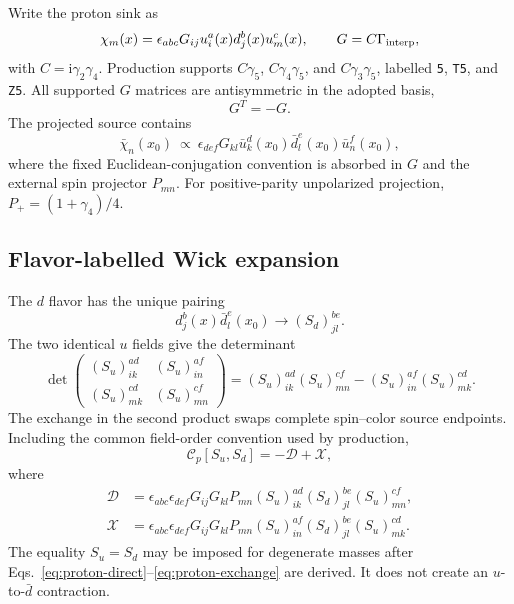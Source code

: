 \documentclass[11pt,a4paper]{article}
\numberwithin{equation}{section}
\newcommand{\ii}{\mathrm{i}}
\newcommand{\code}[1]{%
  \ifmmode\text{\texttt{\detokenize{#1}}}\else\nolinkurl{#1}\fi}
\begin{document}
Write the proton sink as
\begin{equation}
 \chi_m(x)
 =\epsilon_{abc}G_{ij}
 u_i^a(x)d_j^b(x)u_m^c(x),
 \qquad G=C\Gamma_{\rm interp},
 \label{eq:proton-interpolator}
\end{equation}
with \(C=\ii\gamma_2\gamma_4\).  Production supports
\(C\gamma_5\), \(C\gamma_4\gamma_5\), and
\(C\gamma_3\gamma_5\), labelled \code{5}, \code{T5}, and \code{Z5}.
All supported \(G\) matrices are antisymmetric in the adopted basis,
\begin{equation}
 G^T=-G.
\end{equation}
The projected source contains
\begin{equation}
 \bar\chi_n(x_0)\ \propto\
 \epsilon_{def}G_{kl}
 \bar u_k^d(x_0)\bar d_l^e(x_0)\bar u_n^f(x_0),
\end{equation}
where the fixed Euclidean-conjugation convention is absorbed in \(G\) and the
external spin projector \(P_{mn}\).  For positive-parity unpolarized
projection, \(P_+=(1+\gamma_4)/4\).

\subsection{Flavor-labelled Wick expansion}

The \(d\) flavor has the unique pairing
\begin{equation}
 d_j^b(x)\bar d_l^e(x_0)
 \longrightarrow
 (S_d)_{jl}^{be}.
\end{equation}
The two identical \(u\) fields give the determinant
\begin{equation}
 \det\begin{pmatrix}
 (S_u)_{ik}^{ad} & (S_u)_{in}^{af}\\
 (S_u)_{mk}^{cd} & (S_u)_{mn}^{cf}
 \end{pmatrix}
 =
 (S_u)_{ik}^{ad}(S_u)_{mn}^{cf}
 -(S_u)_{in}^{af}(S_u)_{mk}^{cd}.
 \label{eq:proton-u-determinant}
\end{equation}
The exchange in the second product swaps complete spin--color source
endpoints.  Including the common field-order convention used by production,
\begin{equation}
 \boxed{\mathcal C_p[S_u,S_d]=-\mathcal D+\mathcal X,}
 \label{eq:proton-C2-master}
\end{equation}
where
\begin{align}
 \mathcal D
 &=\epsilon_{abc}\epsilon_{def}
   G_{ij}G_{kl}P_{mn}
   (S_u)_{ik}^{ad}(S_d)_{jl}^{be}(S_u)_{mn}^{cf},
 \label{eq:proton-direct}\\
 \mathcal X
 &=\epsilon_{abc}\epsilon_{def}
   G_{ij}G_{kl}P_{mn}
   (S_u)_{in}^{af}(S_d)_{jl}^{be}(S_u)_{mk}^{cd}.
 \label{eq:proton-exchange}
\end{align}
The equality \(S_u=S_d\) may be imposed for degenerate masses after
Eqs.~\eqref{eq:proton-direct}--\eqref{eq:proton-exchange} are derived.  It
does not create an \(u\)-to-\(\bar d\) contraction.
\end{document}
